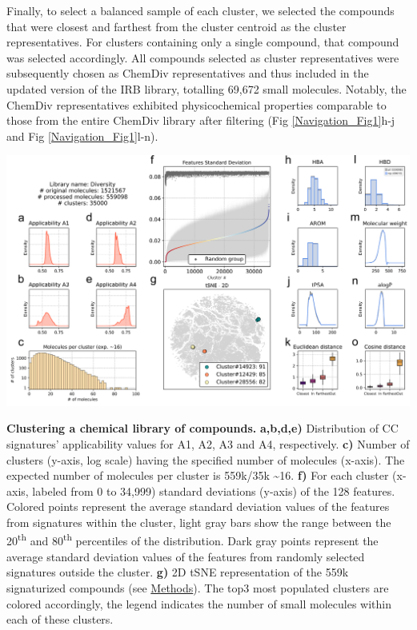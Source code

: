 Finally, to select a balanced sample of each cluster, we selected the compounds that were closest and farthest from the cluster centroid as the cluster representatives. For clusters containing only a single compound, that compound was selected accordingly. All compounds selected as cluster representatives were subsequently chosen as ChemDiv representatives and thus included in the updated version of the IRB library, totalling 69,672 small molecules. Notably, the ChemDiv representatives exhibited physicochemical properties comparable to those from the entire ChemDiv library after filtering (Fig \ref{Navigation_Fig1}h-j and Fig \ref{Navigation_Fig1}l-n). 


\begin{Figure_modified}
  \centering
  \includegraphics[width=1\linewidth]{figures/Navigation/Main/Diversity_random_v3.png}
  \caption{\textbf{Clustering a chemical library of compounds.}
    \textbf{a,b,d,e)} Distribution of CC signatures’ applicability values for A1, A2, A3 and A4, respectively. 
    \textbf{c)} Number of clusters (y-axis, log scale) having the specified number of molecules (x-axis). The expected number of molecules per cluster is 559k/35k \textasciitilde 16.
    \textbf{f)} For each cluster (x-axis, labeled from 0 to 34,999) standard deviations (y-axis) of the 128 features. Colored points represent the average standard deviation values of the features from signatures within the cluster, light gray bars show the range between the 20\textsuperscript{th} and 80\textsuperscript{th} percentiles of the distribution. Dark gray points represent the average standard deviation values of the features from randomly selected signatures outside the cluster.
    \textbf{g)} 2D tSNE representation of the 559k signaturized compounds (see \hyperref[Navigation_Methods]{Methods}). The top3 most populated clusters are colored accordingly, the legend indicates the number of small molecules within each of these clusters.
}
\end{Figure_modified}
